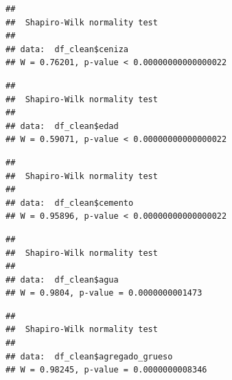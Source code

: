 \documentclass[
]{book}
\newenvironment{Shaded}{\begin{snugshade}}{\end{snugshade}}
\newcommand{\FunctionTok}[1]{\textcolor[rgb]{0.13,0.29,0.53}{\textbf{#1}}}
\newcommand{\NormalTok}[1]{#1}
\newcommand{\SpecialCharTok}[1]{\textcolor[rgb]{0.81,0.36,0.00}{\textbf{#1}}}
\begin{document}
\begin{verbatim}
## 
##  Shapiro-Wilk normality test
## 
## data:  df_clean$ceniza
## W = 0.76201, p-value < 0.00000000000000022
\end{verbatim}

\begin{Shaded}
\end{Shaded}

\begin{verbatim}
## 
##  Shapiro-Wilk normality test
## 
## data:  df_clean$edad
## W = 0.59071, p-value < 0.00000000000000022
\end{verbatim}

\begin{Shaded}
\end{Shaded}

\begin{verbatim}
## 
##  Shapiro-Wilk normality test
## 
## data:  df_clean$cemento
## W = 0.95896, p-value < 0.00000000000000022
\end{verbatim}

\begin{Shaded}
\end{Shaded}

\begin{verbatim}
## 
##  Shapiro-Wilk normality test
## 
## data:  df_clean$agua
## W = 0.9804, p-value = 0.0000000001473
\end{verbatim}

\begin{Shaded}
\end{Shaded}

\begin{verbatim}
## 
##  Shapiro-Wilk normality test
## 
## data:  df_clean$agregado_grueso
## W = 0.98245, p-value = 0.0000000008346
\end{verbatim}
\end{document}
